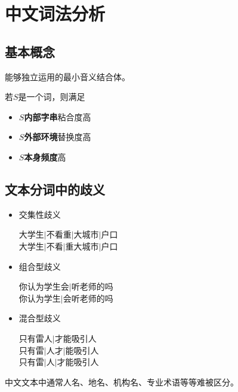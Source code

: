 
\section{中文词法分析}
\subsection{基本概念}
\begin{definition}[词]
能够独立运用的最小音义结合体。
\end{definition}

若$S$是一个词，则满足
\begin{itemize}
\item $S$\textbf{内部字串}粘合度高
\item $S$\textbf{外部环境}替换度高
\item $S$\textbf{本身频度}高
\end{itemize}

\subsection{文本分词中的歧义}
\begin{itemize}
	\item 交集性歧义
\begin{displayquote}
大学生$\mid$不看重$\mid$大城市$\mid$户口\\
大学生$\mid$不看$\mid$重大城市$\mid$户口\\
\end{displayquote}
	\item 组合型歧义
\begin{displayquote}
你认为学生会$\mid$听老师的吗\\
你认为学生$\mid$会听老师的吗\\
\end{displayquote}
	\item 混合型歧义
\begin{displayquote}
只有雷人$\mid$才能吸引人\\
只有雷$\mid$人才$\mid$能吸引人\\
只有雷$\mid$人$\mid$才能吸引人
\end{displayquote}
\end{itemize}

中文文本中通常人名、地名、机构名、专业术语等等难被区分。

